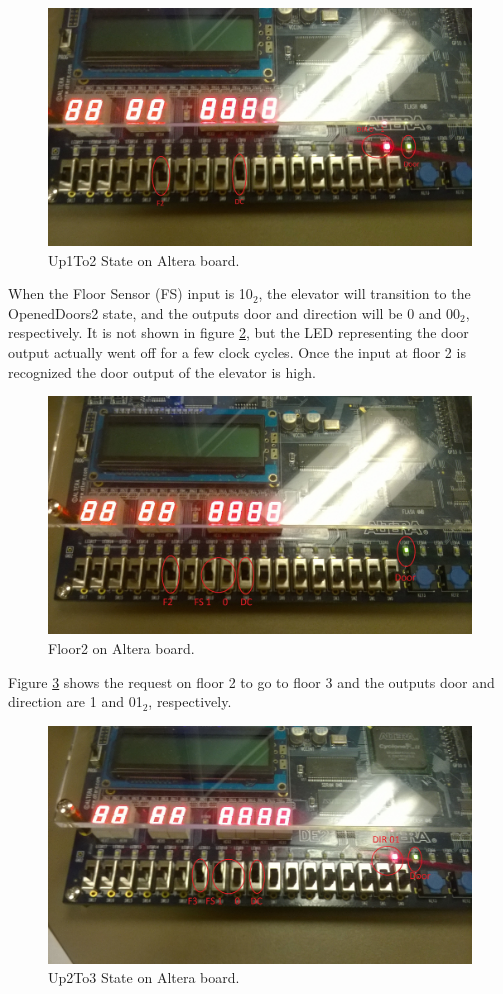 \documentclass[journal]{IEEEtran}
\begin{document}
\begin{figure}[h]
\centering
\includegraphics[width=0.9\linewidth]{Up1To2.jpg}
\caption{Up1To2 State on Altera board.}
\label{up1to2}
\end{figure}

When the Floor Sensor (FS) input is 10$_{2}$, the elevator will transition to the OpenedDoors2 state, and the outputs door and direction will be 0 and 00$_{2}$, respectively. It is not shown in figure \ref{floor2}, but the LED representing the door output actually went off for a few clock cycles. Once the input at floor 2 is recognized the door output of the elevator is high. 

\begin{figure}[h]
\centering
\includegraphics[width=0.9\linewidth]{Floor2.jpg}
\caption{Floor2 on Altera board.}
\label{floor2}
\end{figure}

Figure \ref{up2to3} shows the request on floor 2 to go to floor 3 and the outputs door and direction are 1 and 01$_{2}$, respectively. 

\begin{figure}[h]
\centering
\includegraphics[width=0.9\linewidth]{Up2To3.jpg}
\caption{Up2To3 State on Altera board.}
\label{up2to3}
\end{figure}
\end{document}
